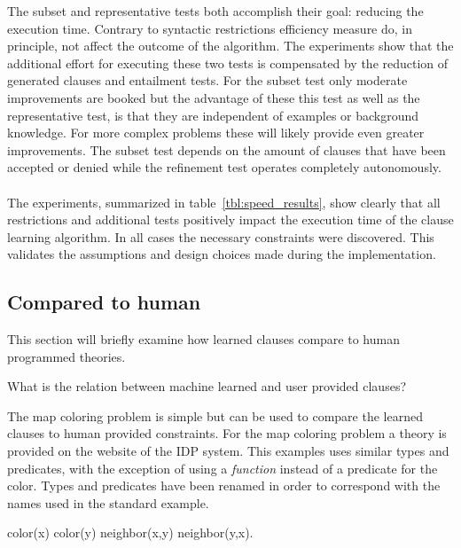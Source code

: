 The subset and representative tests both accomplish their goal: reducing the execution time.
Contrary to syntactic restrictions efficiency measure do, in principle, not affect the outcome of the algorithm.
The experiments show that the additional effort for executing these two tests is compensated by the reduction of generated clauses and entailment tests.
For the subset test only moderate improvements are booked but the advantage of these this test as well as the representative test, is that they are independent of examples or background knowledge.
For more complex problems these will likely provide even greater improvements.
The subset test depends on the amount of clauses that have been accepted or denied while the refinement test operates completely autonomously.
\\\\
The experiments, summarized in table~\ref{tbl:speed_results}, show clearly that all restrictions and additional tests positively impact the execution time of the clause learning algorithm.
In all cases the necessary constraints were discovered.
This validates the assumptions and design choices made during the implementation.


\subsection{Compared to human}

This section will briefly examine how learned clauses compare to human programmed theories.

\begin{question}
	What is the relation between machine learned and user provided clauses?
\end{question}

\begin{observation}
\label{exp:cd_user_show}
	The map coloring problem is simple but can be used to compare the learned clauses to human provided constraints.
	For the map coloring problem a theory is provided on the website of the IDP system.
	This examples uses similar types and predicates, with the exception of using a \emph{function} instead of a predicate for the color.
	Types and predicates have been renamed in order to correspond with the names used in the standard example.  
	\begin{shiftedflalign*}
		color(x) \neq color(y) \leftarrow neighbor(x,y) \lor neighbor(y,x).
	\end{shiftedflalign*}

\end{observation}

